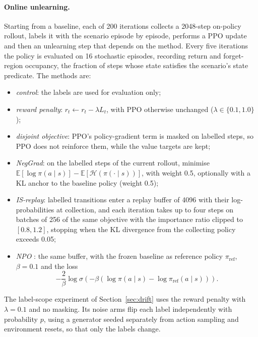 \documentclass{article}
\begin{document}
\paragraph{Online unlearning.} Starting from a baseline, each of 200
iterations collects a 2048-step on-policy rollout, labels it with the
scenario episode by episode, performs a PPO update and then an unlearning
step that depends on the method. Every five iterations the policy is
evaluated on 16 stochastic episodes, recording return and forget-region
occupancy, the fraction of steps whose state satisfies the scenario's
state predicate. The methods are:
\begin{itemize}
\item \emph{control}: the labels are used for evaluation only;
\item \emph{reward penalty}: $r_t\leftarrow r_t-\lambda L_t$, with PPO
otherwise unchanged ($\lambda\in\{0.1,1.0\}$);
\item \emph{disjoint objective}: PPO's policy-gradient term is masked on
labelled steps, so PPO does not reinforce them, while the value targets
are kept;
\item \emph{NegGrad}: on the labelled steps of the current rollout,
minimise $\mathbb{E}[\log\pi(a\mid s)]-\mathbb{E}[\mathcal{H}(\pi(\cdot\mid s))]$,
with weight 0.5, optionally with a KL anchor to the baseline policy
(weight 0.5);
\item \emph{IS-replay}: labelled transitions enter a replay buffer of
4096 with their log-probabilities at collection, and each iteration takes
up to four steps on batches of 256 of the same objective with the
importance ratio clipped to $[0.8,1.2]$, stopping when the KL divergence
from the collecting policy exceeds 0.05;
\item \emph{NPO} \citep{zhang2024npo}: the same buffer, with the frozen
baseline as reference policy $\pi_{\mathrm{ref}}$, $\beta=0.1$ and the loss
\[
-\frac{2}{\beta}\log\sigma\!\left(-\beta\left(\log\pi(a\mid s)-\log\pi_{\mathrm{ref}}(a\mid s)\right)\right).
\]
\end{itemize}
The label-scope experiment of Section~\ref{sec:drift} uses the reward
penalty with $\lambda=0.1$ and no masking. Its noise arms flip each label
independently with probability $p$, using a generator seeded separately
from action sampling and environment resets, so that only the labels
change.


\end{document}
